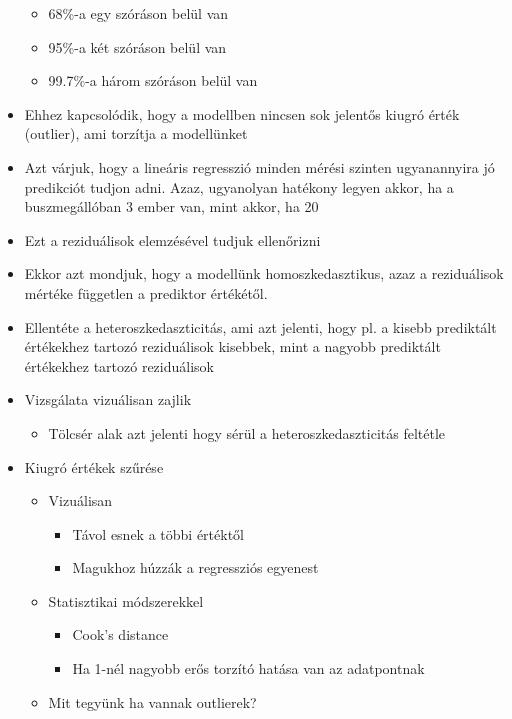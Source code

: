 \documentclass[
  letterpaper,
  DIV=11,
  numbers=noendperiod]{scrreprt}
\providecommand{\tightlist}{%
  \setlength{\itemsep}{0pt}\setlength{\parskip}{0pt}}\usepackage{longtable,booktabs,array}
\begin{document}
\begin{itemize}
  \begin{itemize}
  \item
    68\%-a egy szóráson belül van
  \item
    95\%-a két szóráson belül van
  \item
    99.7\%-a három szóráson belül van
  \end{itemize}
\item
  Ehhez kapcsolódik, hogy a modellben nincsen sok jelentős kiugró érték
  (outlier), ami torzítja a modellünket
\item
  Azt várjuk, hogy a lineáris regresszió minden mérési szinten
  ugyanannyira jó predikciót tudjon adni. Azaz, ugyanolyan hatékony
  legyen akkor, ha a buszmegállóban 3 ember van, mint akkor, ha 20
\item
  Ezt a reziduálisok elemzésével tudjuk ellenőrizni
\item
  Ekkor azt mondjuk, hogy a modellünk homoszkedasztikus, azaz a
  reziduálisok mértéke független a prediktor értékétől.
\item
  Ellentéte a heteroszkedaszticitás, ami azt jelenti, hogy pl. a kisebb
  prediktált értékekhez tartozó reziduálisok kisebbek, mint a nagyobb
  prediktált értékekhez tartozó reziduálisok
\item
  Vizsgálata vizuálisan zajlik

  \begin{itemize}
  \tightlist
  \item
    Tölcsér alak azt jelenti hogy sérül a heteroszkedaszticitás feltétle
  \end{itemize}
\item
  Kiugró értékek szűrése

  \begin{itemize}
  \item
    Vizuálisan

    \begin{itemize}
    \item
      Távol esnek a többi értéktől
    \item
      Magukhoz húzzák a regressziós egyenest
    \end{itemize}
  \item
    Statisztikai módszerekkel

    \begin{itemize}
    \item
      Cook's distance
    \item
      Ha 1-nél nagyobb erős torzító hatása van az adatpontnak
    \end{itemize}
  \item
    Mit tegyünk ha vannak outlierek?


\end{itemize}
\end{itemize}
\end{document}
